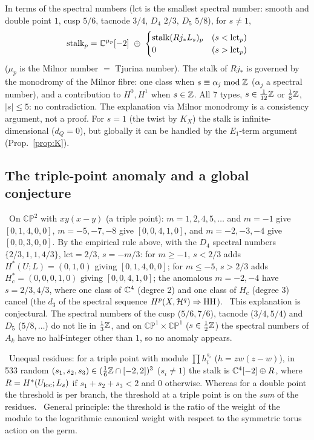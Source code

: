 \begin{obs}
In terms of the spectral numbers (lct is the smallest spectral number: smooth and double point $1$, cusp $5/6$, tacnode $3/4$, $D_4$ $2/3$, $D_5$ $5/8$), for $s\ne1$,
\[\text{stalk}_p=\C^{\mu_p}[-2]\ \oplus\ \begin{cases}\text{stalk}(Rj_*L_s)_p&(s<\mathrm{lct}_p)\\0&(s>\mathrm{lct}_p)\end{cases}\]
($\mu_p$ is the Milnor number $=$ Tjurina number). The stalk of $Rj_*$ is governed by the monodromy of the Milnor fibre: one class when $s\equiv\alpha_j\bmod\mathbb Z$ ($\alpha_j$ a spectral number), and a contribution to $H^0,H^1$ when $s\in\mathbb Z$. All 7 types, $s\in\frac1{12}\mathbb Z$ or $\frac18\mathbb Z$, $|s|\le5$: no contradiction. The explanation via Milnor monodromy is a consistency argument, not a proof. For $s=1$ (the twist by $K_X$) the stalk is infinite-dimensional ($d_Q=0$), but globally it can be handled by the $E_1$-term argument (Prop.~\ref{prop:K}).
\end{obs}
\subsection{The triple-point anomaly and a global conjecture}
\tV\ On $\mathbb{CP}^2$ with $xy(x-y)$ (a triple point): $m=1,2,4,5,\ldots$ and $m=-1$ give $[0,1,4,0,0]$, $m=-5,-7,-8$ give $[0,0,4,1,0]$, and $m=-2,-3,-4$ give $[0,0,3,0,0]$. By the empirical rule above, with the $D_4$ spectral numbers $\{2/3,1,1,4/3\}$, $\mathrm{lct}=2/3$, $s=-m/3$: for $m\ge-1$, $s<2/3$ adds $H^*(U;L)=(0,1,0)$ giving $[0,1,4,0,0]$; for $m\le-5$, $s>2/3$ adds $H_c^*=(0,0,0,1,0)$ giving $[0,0,4,1,0]$; the anomalous $m=-2,-4$ have $s=2/3,4/3$, where one class of $\mathbb C^4$ (degree 2) and one class of $H_c$ (degree 3) cancel (the $d_3$ of the spectral sequence $H^p(X,\mathcal H^q)\Rightarrow\mathrm{HH}$). \tK\ This explanation is conjectural. The spectral numbers of the cusp ($5/6,7/6$), tacnode ($3/4,5/4$) and $D_5$ ($5/8,\ldots$) do not lie in $\frac13\mathbb Z$, and on $\mathbb{CP}^1\times\mathbb{CP}^1$ ($s\in\frac12\mathbb Z$) the spectral numbers of $A_k$ have no half-integer other than $1$, so no anomaly appears.

\tV\ Unequal residues: for a triple point with module $\prod h_i^{s_i}$ ($h=zw(z-w)$), in 533 random $(s_1,s_2,s_3)\in(\frac16\mathbb Z\cap[-2,2])^3$ ($s_i\ne1$) the stalk is $\mathbb C^4[-2]\oplus R$, where $R=H^*(U_{\rm loc};L_s)$ if $s_1+s_2+s_3<2$ and $0$ otherwise. Whereas for a double point the threshold is per branch, the threshold at a triple point is on the \emph{sum} of the residues. \tK\ General principle: the threshold is the ratio of the weight of the module to the logarithmic canonical weight with respect to the symmetric torus action on the germ.

